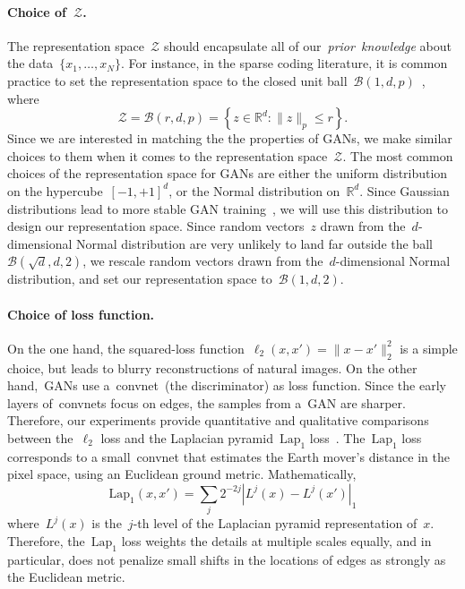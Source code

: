 \documentclass{article}
\begin{document}
\paragraph{Choice of~$\mathcal{Z}$.}
The representation space~$\mathcal{Z}$ should encapsulate all of
our~\emph{prior~knowledge} about the data~$\{x_1, \ldots, x_N\}$.  For
instance, in the sparse coding literature, it is common practice to set the
representation space to the closed unit ball~$\mathcal{B}(1, d,
p)$~\citep{bach2011convex}, where
\begin{equation*}
    \mathcal{Z} = \mathcal{B}(r,d,p) = \left\lbrace z \in \mathbb{R}^d : \| z \|_p
    \leq r
    \right\rbrace.
\end{equation*}
Since we are interested in matching the the properties of GANs, we make similar
choices to them when it comes to the representation space~$\mathcal{Z}$. The
most common choices of the representation space for GANs are either the uniform
distribution on the hypercube~$[-1, +1]^d$, or the Normal distribution
on~$\mathbb{R}^d$. Since Gaussian distributions lead to more stable GAN
training~\citep{dcgan}, we will use this distribution to design our
representation space. Since random vectors~$z$ drawn from the~$d$-dimensional
Normal distribution are very unlikely to land far outside the
ball~$\mathcal{B}(\sqrt{d}, d, 2)$, we rescale random vectors drawn from
the~$d$-dimensional Normal distribution, and set our representation space
to~$\mathcal{B}(1, d, 2)$.

\paragraph{Choice of loss function.}
On the one hand, the squared-loss function~$\ell_2(x,x') = \| x - x' \|_2^2$ is
a simple choice, but leads to blurry reconstructions of natural images.
On the other hand,~GANs use a~convnet~(the discriminator) as loss function. Since
the early layers of~convnets focus on edges, the samples from a~GAN are sharper.
Therefore, our experiments provide quantitative and qualitative comparisons
between the~$\ell_2$ loss and the Laplacian pyramid~$\text{Lap}_1$ loss~\citep{lapl1cost}.
The~$\text{Lap}_1$ loss corresponds to a small~convnet that estimates the Earth
mover's distance in the pixel space, using an Euclidean ground metric. Mathematically,
\begin{equation*}
    \label{eq:laploss}
	\text{Lap}_1(x,x') = \sum_{j} 2^{-2j} |L^j(x) - L^j(x')|_1
\end{equation*}
where~$L^j(x)$ is the~$j$-th level of the Laplacian pyramid representation of~$x$.
Therefore, the~$\text{Lap}_1$ loss weights the details
at multiple scales equally, and in particular, does not penalize small shifts in the locations of edges as strongly as the Euclidean metric.
\end{document}
